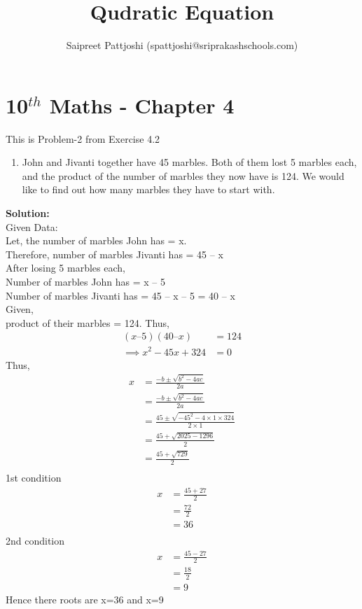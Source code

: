 \documentclass[12pt]{article}
\title{Qudratic Equation}
\author{Saipreet Pattjoshi (spattjoshi@sriprakashschools.com)}
\newcommand{\solution}{\noindent \textbf{Solution: }}
\providecommand{\brak}[1]{\ensuremath{\left(#1\right)}}
\begin{document}
\maketitle
\section*{10$^{th}$ Maths - Chapter 4}
This is Problem-2 from Exercise 4.2
\begin{enumerate}
\item John and Jivanti together have 45 marbles. Both of them lost 5 marbles each, and the product of the number of marbles they now have is 124. We would like to find out how many marbles they have to start with.
\end{enumerate}
\solution \\
Given Data:\\
Let, the number of marbles John has = x.\\
Therefore, number of marbles Jivanti has = 45 – x\\
After losing 5 marbles each,\\
Number of marbles John has = x – 5\\
Number of marbles Jivanti has = 45 – x – 5 = 40 – x\\
Given,\\
 product of their marbles = 124.  Thus,
 \begin{align}
\brak{x – 5}\brak{40 – x} &= 124\\
\implies x^2-45x+324&=0
 \end{align}
 Thus,
\begin{align}
x &=\frac{-b\pm\sqrt{b^2-4ac}}{2a}\\
 &=\frac{-b\pm\sqrt{b^2-4ac}}{2a}\\
 &=\frac{45\pm\sqrt{-45^2-4 \times 1\times324}}{2 \times 1}\\
 &=\frac{45+\sqrt{2025-1296}}{2}\\
 &=\frac{45+\sqrt{729}}{2}\\
\end{align}
1st condition\\
\begin{align}
x &=\frac{45+27}{2}\\
 &=\frac{72}{2}\\
 &=36\\
\end{align}
2nd condition\\
\begin{align}
x &=\frac{45-27}{2}\\
 &=\frac{18}{2}\\
 &=9
\end{align}
Hence there roots are x=36 and x=9
\end{document}
